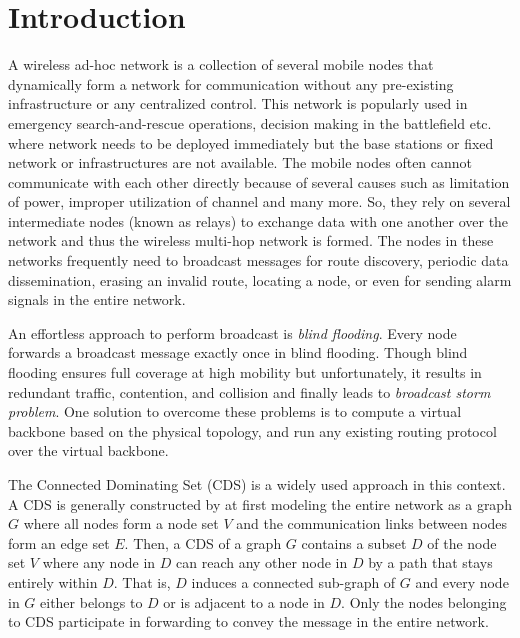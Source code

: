 \section{Introduction}
\label{introduction}
A wireless ad-hoc network is a collection of several mobile nodes that dynamically form a network for communication without any pre-existing infrastructure or any centralized control. This network is popularly used in emergency search-and-rescue operations, decision making in the battlefield etc. where network needs to be deployed immediately but the base stations or fixed network or infrastructures are not available. The mobile nodes often cannot communicate with each other directly because of several causes such as limitation of power, improper utilization of channel and many more. So, they rely on several intermediate nodes (known as relays) to exchange data with one another over the network and thus the wireless multi-hop network is formed.
 The nodes in these networks frequently need to broadcast messages for route discovery, periodic data dissemination, erasing an invalid route, locating a node,  or even for sending alarm signals in the entire network.
 
An effortless approach to perform broadcast is \emph{blind flooding}. Every node forwards a broadcast message exactly once in blind flooding. Though blind flooding ensures full coverage at high mobility but unfortunately, it results in redundant traffic, contention, and collision and finally leads to \textit{broadcast storm problem}\cite{tseng2002broadcast}. One solution to overcome these problems is to compute a virtual backbone based on the physical topology, and run any existing routing protocol over the virtual backbone\cite{butenko2004new}. 

The Connected Dominating Set (CDS) is a widely used approach in this context. A CDS is generally constructed by at first modeling the entire network as a graph $G$ where all nodes form a node set $V$ and the communication links between nodes form an edge set $E$. Then, a CDS of a graph $G$ contains a subset $D$ of the node set $V$ where any node in $D$ can reach any other node in $D$ by a path that stays entirely within $D$. That is, $D$ induces a connected sub-graph of $G$ and every node in $G$ either belongs to $D$ or is adjacent to a node in $D$.  Only the nodes belonging to CDS  participate in forwarding to convey the message in the entire network.

